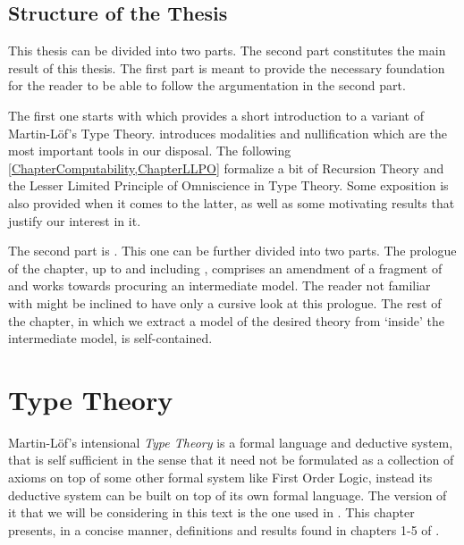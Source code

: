 \documentclass[12pt]{report}
\theoremstyle{definition}
\begin{document}
\section{Structure of the Thesis}
This thesis can be divided into two parts. 
The second part constitutes the main result of this thesis. 
The first part is meant to provide the necessary foundation for the reader to be able to follow the argumentation in the second part. 

The first one starts with  which provides a short introduction to a variant of Martin-L\"of's Type Theory. 
 introduces modalities and nullification which are the most important tools in our disposal. 
The following \cref{ChapterComputability,ChapterLLPO} formalize a bit of Recursion Theory and the Lesser Limited Principle of Omniscience in Type Theory. 
Some exposition is also provided when it comes to the latter, as well as some motivating results that justify our interest in it. 

The second part is . 
This one can be further divided into two parts. 
The prologue of the chapter, up to and including , comprises an amendment of a fragment of \cite{1905.03014} and works towards procuring an intermediate model. 
The reader not familiar with \cite{1905.03014} might be inclined to have only a cursive look at this prologue. 
The rest of the chapter, in which we extract a model of the desired theory from `inside' the intermediate model, is self-contained. 

\chapter{Type Theory}\label{ChapterTT}
Martin-L\"of's intensional \textit{Type Theory} is a formal language and deductive system, that is self sufficient in the sense that it need not be formulated as a collection of axioms on top of some other formal system like First Order Logic, instead its deductive system can be built on top of its own formal language. 
The version of it that we will be considering in this text is the one used in \cite{hottbook}. 
This chapter presents, in a concise manner, definitions and results found in chapters 1-5 of \cite{hottbook}. 
\end{document}
